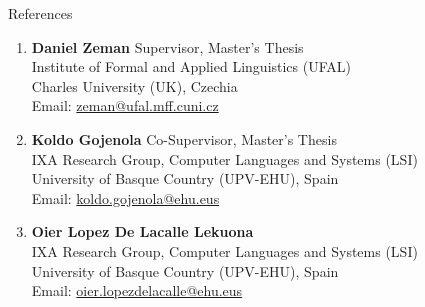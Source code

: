\documentclass{resume}
\begin{document}
\begin{rSection}{References}

    \begin{enumerate}
        \item \textbf{Daniel Zeman} \hfill Supervisor, Master's Thesis\\
            Institute of Formal and Applied Linguistics (UFAL)\\
            Charles University (UK), Czechia\\
            Email: \href{mailto:zeman@ufal.mff.cuni.cz}{zeman@ufal.mff.cuni.cz}
        
        \item \textbf{Koldo Gojenola} \hfill Co-Supervisor, Master's Thesis\\
            IXA Research Group, Computer Languages and Systems (LSI)\\
            University of Basque Country (UPV-EHU), Spain\\
            Email: \href{mailto:koldo.gojenola@ehu.eus}{koldo.gojenola@ehu.eus}
        
        \item \textbf{Oier Lopez De Lacalle Lekuona}\\
            IXA Research Group, Computer Languages and Systems (LSI)\\
            University of Basque Country (UPV-EHU), Spain\\
            Email: \href{mailto:oier.lopezdelacalle@ehu.eus}{oier.lopezdelacalle@ehu.eus}
    \end{enumerate}

\end{rSection}
\end{document}
